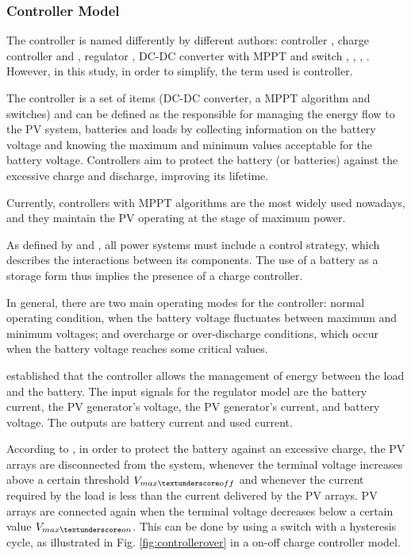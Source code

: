 \subsubsection{Controller Model}
\label{sec:controller}

The controller is named differently by different authors: controller \cite{Hansen}, charge controller \cite{Mahanta} and \cite{Chauhan}, regulator \cite{Mellit}, DC-DC converter with MPPT and switch \cite{Dhanowa}, \cite{Yatimi}, \cite{Abdulateef}, \cite{Roy}. However, in this study, in order to simplify, the term used is controller. 

The controller is a set of items (DC-DC converter, a MPPT algorithm and switches) and can be defined as the responsible for managing the energy flow to the PV system, batteries and loads by collecting information on the battery voltage and knowing the maximum and minimum values acceptable for the battery voltage. Controllers aim to protect the battery (or batteries) against the excessive charge and discharge, improving its lifetime. 

Currently, controllers with MPPT algorithms are the most widely used nowadays,  and they maintain the PV operating at the stage of maximum power.

As defined by \cite{Hansen} and \cite{Mellit}, all power systems must include a control strategy, which describes the interactions between its components. The use of a battery as a storage form thus implies the presence of a charge controller. 

In general, there are two main operating modes for the controller: normal operating condition, when the battery voltage fluctuates between maximum and minimum voltages; and overcharge or over-discharge conditions, which occur when the battery voltage reaches some critical values. 

\cite{Mellit} established that the controller allows the management of energy between the load and the battery. The input signals for the regulator model are the battery current, the PV generator's voltage, the PV generator's current, and battery voltage. The outputs are battery current and used current. 

According to \cite{Hansen}, in order to protect the battery against an excessive charge, the PV arrays are disconnected from the system, whenever the terminal voltage increases above a certain threshold $ V_{max \textunderscore off} $ and whenever the current required by the load is less than the current delivered by the PV arrays. PV arrays are connected again when the terminal voltage decreases below a certain value $ V_{max \textunderscore on} $. This can be done by using a switch with a hysteresis cycle, as illustrated in Fig. \ref{fig:controllerover} in a on-off charge controller model.

